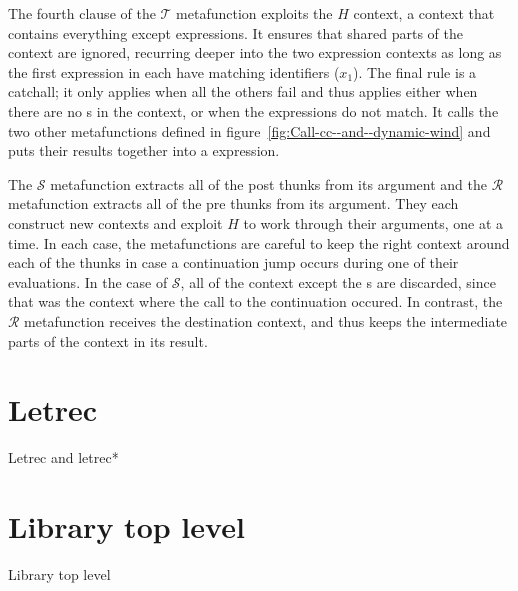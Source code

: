 The fourth clause of the $\mathscr{T}$ metafunction exploits the
$H$ context, a context that contains everything except
 expressions. It ensures that shared parts of the
 context are ignored, recurring deeper into the
two expression contexts as long as the first  expression in
each have matching identifiers ($x_1$). The final rule is a
catchall; it only applies when all the others fail and thus applies
either when there are no s in the context, or when the
 expressions do not match. It calls the two other
metafunctions defined in figure~\ref{fig:Call-cc--and--dynamic-wind} and
puts their results together into a  expression.

The $\mathscr{S}$ metafunction extracts all of the post thunks from
its argument and the $\mathscr{R}$ metafunction extracts all of the pre
thunks from its argument. They each construct new contexts and exploit
$H$ to work through their arguments, one  at a time.
In each case, the metafunctions are careful to keep the right
 context around each of the thunks in case a continuation
jump occurs during one of their evaluations. In the case of
$\mathscr{S}$, all of the context except the s are
discarded, since that was the context where the call to the
continuation occured. In contrast, the $\mathscr{R}$ metafunction
receives the destination context, and thus keeps the intermediate
parts of the context in its result.

\section{Letrec}

\beginfig
\begin{center}

\end{center}
\caption{Letrec and letrec*}
\label{fig:Letrec}
\endfig



\section{Library top level}

\beginfig
\begin{center}

\end{center}
\caption{Library top level}\label{fig:Top--level--and--Variables}
\endfig


